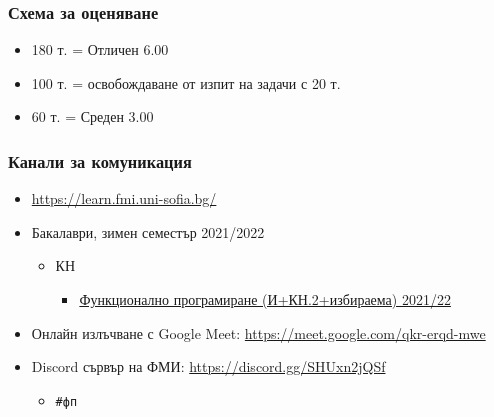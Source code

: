 \documentclass[alsotrans]{beamerswitch}
\begin{document}
\begin{frame}
  \frametitle{Схема за оценяване}

  \begin{itemize}
  \item 180 т. = Отличен 6.00
  \item 100 т. = освобождаване от изпит на задачи с 20 т.
  \item 60 т. = Среден 3.00
  \end{itemize}
\end{frame}

\begin{frame}
  \frametitle{Канали за комуникация}
  
  \begin{itemize}
  \item \url{https://learn.fmi.uni-sofia.bg/}
  \item Бакалаври, зимен семестър 2021/2022
    \begin{itemize}
    \item КН
      \begin{itemize}
      \item \hyperlink{https://learn.fmi.uni-sofia.bg/course/view.php?id=7526}{Функционално програмиране (И+КН.2+избираема) 2021/22}
      \end{itemize}
    \end{itemize}
  \item Онлайн излъчване с Google Meet: \url{https://meet.google.com/qkr-erqd-mwe}
  \item Discord сървър на ФМИ: \url{https://discord.gg/SHUxn2jQSf}
    \begin{itemize}
    \item \tt{\#фп}
    \end{itemize}
  \end{itemize}
\end{frame}
\end{document}
